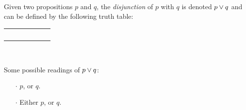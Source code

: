 \begin{definition}[Disjunction]
    \begin{center}
        \begin{minipage}[t]{.55\linewidth}
            Given two propositions \(p\) and \(q\), the \emph{disjunction} of \(p\) with \(q\)
            is denoted \(p \vee q\) and can be defined by the following truth table:
            \begin{table}[H]
                \centering
                \label{tab:or}
                \begin{tabular}{|CcCc||Cc|} \hline
                     &  &  \\ \hline
                    \thead{\(\top\)} & \thead{\(\top\)} &  \\
                    \thead{\(\top\)} & \thead{\(\bot\)} &  \\
                    \thead{\(\bot\)} & \thead{\(\top\)} &  \\
                    \thead{\(\bot\)} & \thead{\(\bot\)} &  \\ \hline
                \end{tabular}
            \end{table}
        \end{minipage}%
        \begin{minipage}[t]{.05\linewidth}
            ~
        \end{minipage}%
        \begin{minipage}[t]{.4\linewidth}
            Some possible readings of \(p \vee q\):\\
            \begin{itemize}
                \item[\(\cdot\)]
                    \(p\), or \(q\).
                \item[\(\cdot\)]
                    Either \(p\), or \(q\).
            \end{itemize}
        \end{minipage}
    \end{center}
\end{definition}

\newpage

